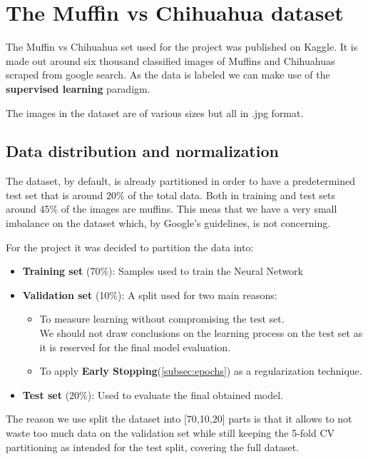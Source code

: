 \newpage


\section{The Muffin vs Chihuahua dataset}\label{sec:the-muffin-vs-chihuahua-dataset}

The Muffin vs Chihuahua set used for the project was published on Kaggle\cite{datasetCite}.
It is made out around six thousand classified images of Muffins and Chihuahuas scraped from google search.
As the data is labeled we can make use of the \textbf{supervised learning} paradigm.

The images in the dataset are of various sizes but all in .jpg format.

\subsection{Data distribution and normalization}
The dataset, by default, is already partitioned in order to have a predetermined test set that is around 20\% of the total data.
Both in training and test sets around 45\% of the images are muffins.
This meas that we have a very small imbalance on the dataset which, by Google's\cite{googleBalance} guidelines, is not concerning.

For the project it was decided to partition the data into:
\begin{itemize}
    \item \textbf{Training set} (70\%): Samples used to train the Neural Network
    \item \textbf{Validation set} (10\%): A split used for two main reasons:
    \begin{itemize}
        \item To measure learning without compromising the test set.\\
        We should not draw conclusions on the learning process on the test set as it is reserved for the final model evaluation.
        \item To apply \textbf{Early Stopping}(\ref{subsec:epochs}) as a regularization technique.

    \end{itemize}
    \item \textbf{Test set} (20\%): Used to evaluate the final obtained model.
\end{itemize}

The reason we use split the dataset into [70,10,20] parts is that it allows to not waste too much data on the validation set while still
keeping the 5-fold CV partitioning as intended for the test split, covering the full dataset.

